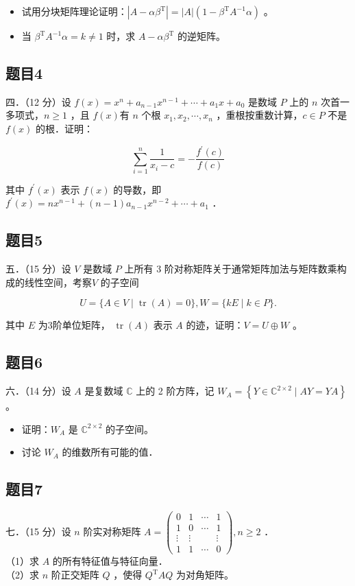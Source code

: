 \documentclass{article}
\begin{document}
\begin{itemize}
  \item[（1）] 试用分块矩阵理论证明：\(\left|A-\alpha \beta^{\mathrm{T}}\right|=|A|\left(1-\beta^{\mathrm{T}} A^{-1} \alpha\right)\) 。
  \item[（2）] 当 \(\beta^{\mathrm{T}} A^{-1} \alpha=k \neq 1\) 时，求 \(A-\alpha \beta^{\mathrm{T}}\) 的逆矩阵。
\end{itemize}

\subsection{题目4}
四．（12 分）设 \(f(x)=x^{n}+a_{n-1} x^{n-1}+\cdots+a_{1} x+a_{0}\) 是数域 \(P\) 上的 \(n\) 次首一多项式，\(n \geq 1\) ，且 \(f(x)\)有 \(n\) 个根 \(x_{1}, x_{2}, \cdots, x_{n}\) ，重根按重数计算，\(c \in P\) 不是 \(f(x)\) 的根．证明：

\[
\sum_{i=1}^{n} \frac{1}{x_{i}-c}=-\frac{f^{\prime}(c)}{f(c)}
\]

其中 \(f^{\prime}(x)\) 表示 \(f(x)\) 的导数，即 \(f^{\prime}(x)=n x^{n-1}+(n-1) a_{n-1} x^{n-2}+\cdots+a_{1}\) ．

\subsection{题目5}
五．（15 分）设 \(V\) 是数域 \(P\) 上所有 3 阶对称矩阵关于通常矩阵加法与矩阵数乘构成的线性空间，考察\(V\) 的子空间

\[
U=\{A \in V \mid \operatorname{tr}(A)=0\}, W=\{k E \mid k \in P\} .
\]

其中 \(E\) 为3阶单位矩阵， \(\operatorname{tr}(A)\) 表示 \(A\) 的迹，证明：\(V=U \oplus W\) 。

\subsection{题目6}
六．（14 分）设 \(A\) 是复数域 \(\mathbb{C}\) 上的 2 阶方阵，记 \(W_{A}=\left\{Y \in \mathbb{C}^{2 \times 2} \mid A Y=Y A\right\}\) 。

\begin{itemize}
  \item[（1）] 证明：\(W_{A}\) 是 \(\mathbb{C}^{2 \times 2}\) 的子空间。
  \item[（2）] 讨论 \(W_{A}\) 的维数所有可能的值．
\end{itemize}

\subsection{题目7}
七．（15 分）设 \(n\) 阶实对称矩阵 \(A=\left(\begin{array}{cccc}0 & 1 & \cdots & 1 \\ 1 & 0 & \cdots & 1 \\ \vdots & \vdots & & \vdots \\ 1 & 1 & \cdots & 0\end{array}\right), n \geq 2\) ．\\
（1）求 \(A\) 的所有特征值与特征向量．\\
（2）求 \(n\) 阶正交矩阵 \(Q\) ，使得 \(Q^{\mathrm{T}} A Q\) 为对角矩阵。
\end{document}
